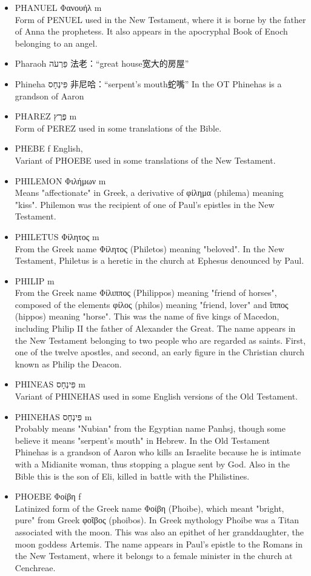 \begin{itemize}
\item PHANUEL Φανουήλ m \\
Form of PENUEL used in the New Testament, where it is borne by the father of Anna the prophetess. It also appears in the apocryphal Book of Enoch belonging to an angel.
\item Pharaoh פַּרְעֹה‎ 法老：“great house宽大的房屋”
\item Phineha פִּינְחָס 非尼哈：“serpent's mouth蛇嘴” In the OT Phinehas is a grandson of Aaron
\item PHAREZ פֶּרֶץ m \\
Form of PEREZ used in some translations of the Bible.
\item PHEBE f English, \\
Variant of PHOEBE used in some translations of the New Testament.
\item PHILEMON Φιλήμων m \\
Means "affectionate" in Greek, a derivative of φίλημα (philema) meaning "kiss". Philemon was the recipient of one of Paul's epistles in the New Testament.
\item PHILETUS Φίλητος m \\
From the Greek name Φίλητος (Philetos) meaning "beloved". In the New Testament, Philetus is a heretic in the church at Ephesus denounced by Paul.
\item PHILIP m \\
From the Greek name Φίλιππος (Philippos) meaning "friend of horses", composed of the elements φίλος (philos) meaning "friend, lover" and ἵππος (hippos) meaning "horse". This was the name of five kings of Macedon, including Philip II the father of Alexander the Great. The name appears in the New Testament belonging to two people who are regarded as saints. First, one of the twelve apostles, and second, an early figure in the Christian church known as Philip the Deacon.
\item PHINEAS פִּינְחָס m \\
Variant of PHINEHAS used in some English versions of the Old Testament.
\item PHINEHAS פִּינְחָס m\\
Probably means "Nubian" from the Egyptian name Panhsj, though some believe it means "serpent's mouth" in Hebrew. In the Old Testament Phinehas is a grandson of Aaron who kills an Israelite because he is intimate with a Midianite woman, thus stopping a plague sent by God. Also in the Bible this is the son of Eli, killed in battle with the Philistines.
\item PHOEBE Φοίβη f \\
Latinized form of the Greek name Φοίβη (Phoibe), which meant "bright, pure" from Greek φοῖβος (phoibos). In Greek mythology Phoibe was a Titan associated with the moon. This was also an epithet of her granddaughter, the moon goddess Artemis. The name appears in Paul's epistle to the Romans in the New Testament, where it belongs to a female minister in the church at Cenchreae. 


\end{itemize}
